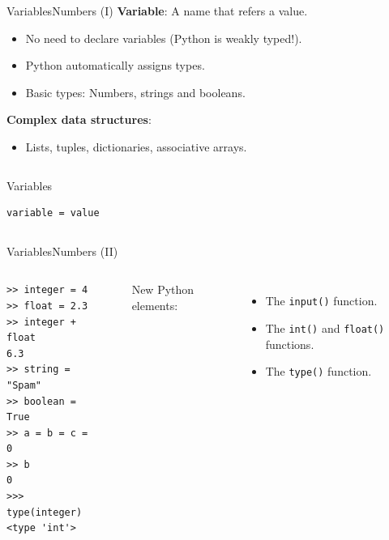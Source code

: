 \documentclass[10pt,compress]{beamer} %
\begin{document}
\begin{frame}[fragile]{Variables}{Numbers (I)}
 	\textbf{Variable}: A name that refers a value.
	\begin{itemize}
		\item No need to declare variables (Python is weakly typed!).
		\item Python automatically assigns types.
		\item Basic types: Numbers, strings and booleans.
	\end{itemize}
	\textbf{Complex data structures}:
		\begin{itemize}
		\item Lists, tuples, dictionaries, associative arrays.
		\end{itemize}

    \begin{columns}
	\begin{block}{Variables}
	\begin{verbatim}
variable = value
\end{verbatim}
	\end{block}
	\end{columns}
\end{frame}

\begin{frame}[fragile]{Variables}{Numbers (II)}
   	\begin{columns}
		\begin{exampleblock}{}
		\begin{verbatim}
>> integer = 4
>> float = 2.3
>> integer + float
6.3
>> string = "Spam"
>> boolean = True
>> a = b = c = 0
>> b
0
>>> type(integer)
<type 'int'>
\end{verbatim}
		\end{exampleblock}


		\begin{exampleblock}{}
		
		\end{exampleblock}

	    \bigskip
        New Python elements:
        \begin{itemize}
            \item The \texttt{input()} function.
		    \item The \texttt{int()} and \texttt{float()} functions.
            \item The \texttt{type()} function.
        \end{itemize}
   \end{columns}
\end{frame}
\end{document}
